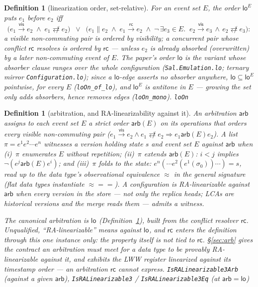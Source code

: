 \documentclass[11pt]{article}
\newtheorem{definition}[theorem]{Definition}
\newcommand{\vis}{\xrightarrow{\mathsf{vis}}}
\newcommand{\rc}{\xrightarrow{\mathsf{rc}}}      %
\newcommand{\rcrel}{\mathsf{rc}}                 %
\newcommand{\ncomm}{\not\rightleftarrows}
\newcommand{\Sinit}{\sigma_0}
\newcommand{\loE}[1]{\mathsf{lo}^{#1}}
\newcommand{\lean}[1]{\texttt{#1}}
\newcommand{\eqobs}{\approx}
\newcommand{\arb}{\mathsf{arb}}
\begin{document}
\begin{definition}[linearization order, set-relative]
\label{def:lo}
For an event set $E$, the order $\loE{E}$ puts $e_1$ before $e_2$ iff
\[
\bigl(e_1 \vis e_2 \;\wedge\; e_1 \ncomm e_2\bigr)
\;\;\vee\;\;
\bigl(e_1 \parallel e_2 \;\wedge\; e_1 \rc e_2 \;\wedge\;
  \neg\,\exists e_3 \in E.\;\; e_2 \vis e_3 \,\wedge\, e_2 \ncomm e_3\bigr):
\]
a visible non-commuting pair is ordered by visibility; a concurrent pair
whose conflict $\rcrel$ resolves is ordered by $\rcrel$ ---
unless $e_2$ is already \emph{absorbed} (overwritten) by a later
non-commuting event of $E$. The paper's order $\mathsf{lo}$ is the
variant whose absorber clause ranges over the whole configuration
(\lean{Sal.Emulation.lo}; ternary mirror \lean{Configuration.lo});
since a $\mathsf{lo}$-edge asserts \emph{no absorber anywhere},
$\mathsf{lo} \subseteq \loE{E}$ pointwise, for every $E$
(\lean{loOn\_of\_lo}), and $\loE{E}$ is antitone in $E$ --- growing the
set only adds absorbers, hence removes edges (\lean{loOn\_mono}).
\hfill\lean{loOn}
\end{definition}

\begin{definition}[arbitration, and RA-linearizability against it]
\label{def:ralin}
An \emph{arbitration} $\arb$ assigns to each event set $E$ a strict order
$\arb(E)$ on its operations that orders every visible non-commuting pair
($e_1 \vis e_2 \wedge e_1 \ncomm e_2 \Rightarrow e_1 \mathrel{\arb(E)}
e_2$). A list $\pi = e^1 e^2 \cdots e^n$ \emph{witnesses} a version holding
state $s$ and event set $E$ \emph{against $\arb$} when (i)~$\pi$ enumerates
$E$ without repetition; (ii)~$\pi$ \emph{extends} $\arb(E)$: $i < j$ implies
$\neg(e^j \mathrel{\arb(E)} e^i)$; and (iii)~$\pi$ \emph{folds} to the
state: $e^n(\cdots e^2(e^1(\Sinit))\cdots) = s$, read up to the data type's
observational equivalence $\eqobs$ in the general signature (flat data
types instantiate ${\eqobs} = {=}$). A configuration is \emph{RA-linearizable
against $\arb$} when \emph{every version in the store} --- not only the
replica heads; LCAs are historical versions and the merge reads them ---
admits a witness.

The \emph{canonical} arbitration is $\loE{}$ (Definition~\ref{def:lo}),
built from the conflict resolver $\rcrel$. \emph{Unqualified,
``RA-linearizable'' means against $\loE{}$}, and $\rcrel$ enters the
definition through this one instance only: the property itself is not tied
to $\rcrel$. \S\ref{sec:arb} gives the contract an arbitration must meet
for a data type to be provably RA-linearizable against it, and exhibits the
LWW register linearized against its timestamp order --- an arbitration
$\rcrel$ cannot express.
\hfill\lean{IsRALinearizable3Arb} (against a given $\arb$),
\lean{IsRALinearizable3} / \lean{IsRALinearizable3Eq} (at $\arb = \loE{}$)
\end{definition}
\end{document}
